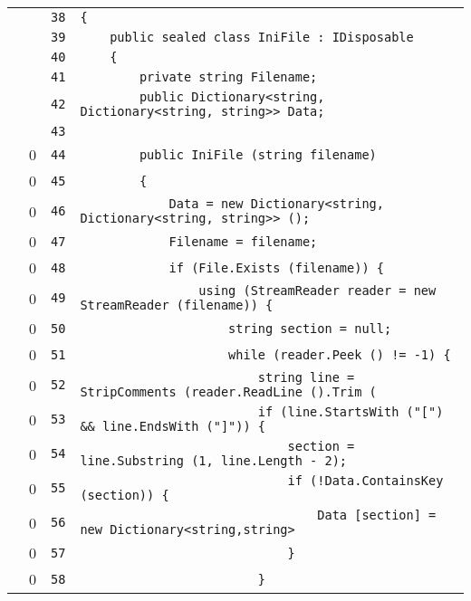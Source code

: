\documentclass[a4paper,10pt]{article}
\begin{document}
\begin{longtable}[l]{lrrl}
\cellcolor{gray} &  & \verb~38~ & \verb~{~\\
\cellcolor{gray} &  & \verb~39~ & \verb~    public sealed class IniFile : IDisposable~\\
\cellcolor{gray} &  & \verb~40~ & \verb~    {~\\
\cellcolor{gray} &  & \verb~41~ & \verb~        private string Filename;~\\
\cellcolor{gray} &  & \verb~42~ & \verb~        public Dictionary<string, Dictionary<string, string>> Data;~\\
\cellcolor{gray} &  & \verb~43~ & \verb~~\\
\cellcolor{red} & 0 & \verb~44~ & \verb~        public IniFile (string filename)~\\
\cellcolor{red} & 0 & \verb~45~ & \verb~        {~\\
\cellcolor{red} & 0 & \verb~46~ & \verb~            Data = new Dictionary<string, Dictionary<string, string>> ();~\\
\cellcolor{red} & 0 & \verb~47~ & \verb~            Filename = filename;~\\
\cellcolor{red} & 0 & \verb~48~ & \verb~            if (File.Exists (filename)) {~\\
\cellcolor{red} & 0 & \verb~49~ & \verb~                using (StreamReader reader = new StreamReader (filename)) {~\\
\cellcolor{red} & 0 & \verb~50~ & \verb~                    string section = null;~\\
\cellcolor{red} & 0 & \verb~51~ & \verb~                    while (reader.Peek () != -1) {~\\
\cellcolor{red} & 0 & \verb~52~ & \verb~                        string line = StripComments (reader.ReadLine ().Trim (~\\
\cellcolor{red} & 0 & \verb~53~ & \verb~                        if (line.StartsWith ("[") && line.EndsWith ("]")) {~\\
\cellcolor{red} & 0 & \verb~54~ & \verb~                            section = line.Substring (1, line.Length - 2);~\\
\cellcolor{red} & 0 & \verb~55~ & \verb~                            if (!Data.ContainsKey (section)) {~\\
\cellcolor{red} & 0 & \verb~56~ & \verb~                                Data [section] = new Dictionary<string,string>~\\
\cellcolor{red} & 0 & \verb~57~ & \verb~                            }~\\
\cellcolor{red} & 0 & \verb~58~ & \verb~                        }~\\

\end{longtable}
\end{document}
